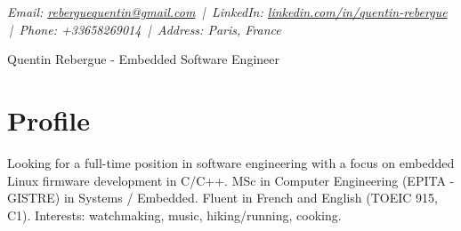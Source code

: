 \documentclass[9pt,a4paper]{article}
\newcommand{\namefont}{\fontsize{18}{22}\selectfont}
\newcommand{\tinyscript}{\fontsize{8}{8}\selectfont}
\begin{document}
\renewcommand\normalsize{\fontsize{10.5}{15}\selectfont}
\normalsize

\begin{center}
  {\tinyscript\itshape
  Email: \href{mailto:reberguequentin@gmail.com}{reberguequentin@gmail.com} \,|\,
  LinkedIn: \href{https://linkedin.com/in/quentin-rebergue}{linkedin.com/in/quentin-rebergue} \,|\,
  Phone: +33658269014 \,|\,
  Address: Paris, France}
\end{center}

\begin{center}
  {\namefont Quentin Rebergue - Embedded Software Engineer}
\end{center}

\section*{Profile}
\begin{tcolorbox}[mybox2]
Looking for a full-time position in software engineering with a focus on embedded Linux firmware development in C/C++. MSc in Computer Engineering (EPITA - GISTRE) in Systems / Embedded. Fluent in French and English (TOEIC 915, C1). Interests: watchmaking, music, hiking/running, cooking.
\end{tcolorbox}
\end{document}

